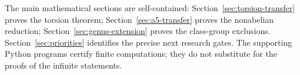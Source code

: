 \documentclass[11pt,a4paper]{article}
\theoremstyle{definition}
\theoremstyle{remark}
\numberwithin{equation}{section}
\begin{document}
The main mathematical sections are self-contained:
Section~\ref{sec:torsion-transfer} proves the torsion theorem;
Section~\ref{sec:a5-transfer} proves the nonabelian reduction;
Section~\ref{sec:genus-extension} proves the class-group exclusions.
Section~\ref{sec:priorities} identifies the precise next research gates.
The supporting Python programs certify finite computations; they do not
substitute for the proofs of the infinite statements.

\clearpage
\begingroup
\small
\setlength{\parskip}{0pt}
\tableofcontents
\endgroup
\clearpage


\clearpage


\clearpage

\clearpage



\begingroup
\small

\endgroup
\end{document}
